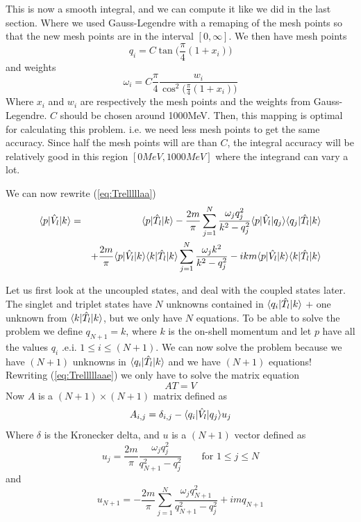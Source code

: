 This is now a smooth integral, and we can compute it like we did in the last section. Where we used Gauss-Legendre with a remaping
of the mesh points so that the new mesh points are in the interval $[0,\infty]$. 
We then have mesh points
\begin{equation}
q_i=C\tan\bigg(\frac{\pi}{4}(1+x_i)\bigg)
\end{equation}
and weights
\begin{equation}
\omega_i=C\frac{\pi}{4}\frac{w_i}{\cos ^2\big(\frac{\pi}{4}(1+x_i)\big)}
\end{equation}
Where $x_i$ and $w_i$ are respectively the mesh points and the weights from Gauss-Legendre. $C$ should be chosen around 1000MeV. 
Then, this mapping is optimal
for calculating this problem. i.e. we need less mesh points to get the same accuracy. Since half the mesh points will are
than $C$, the integral accuracy will be relatively good in this region $[0 MeV,1000 MeV]$ where the integrand can vary a lot.   

We can now rewrite (\ref{eq:Trelllllaa})
\begin{eqnarray}\label{eq:Trelllllaae}
\braketm{{ p}}{\op{V}_l}{{ k}}&=&\braketm{{ p}} {\op{T}_l}{{ k}}
- \frac{2m}{\pi}\sum^N_{j=1}
\frac{\omega_j q^2_j}{{ k^2}-{ q^2_j}}\bra{{ p}}\op{V}_l\ket{{ q_j}} \bra{{ q_j}} \op{T}_l\ket{{ k}}\nonumber\\
&&+
\frac{2m}{\pi}\bra{{ p}}\op{V}_l\ket{{ k}}
\bra{{ k}} \op{T}_l\ket{{ k}}\sum^N_{j=1} \frac{\omega_jk^2}{{ k^2}-{ q^2_j}}
-
i { k}m \bra{{ p}}\op{V_l}\ket{{ k}}
\bra{{ k}}\op{T}_l\ket{{ k}}
\end{eqnarray}

Let us first look at the  uncoupled states, and deal with the coupled  states later. 
The singlet and triplet states have $N$ unknowns contained in $\langle{ q_i}|\hat{T}_l|{ k}\rangle$ $+$ one unknown from
$\langle{ k}|\hat{T}_l|{ k}\rangle$, but we only have $N$ equations. To be able to solve the problem we 
define $q_{N+1}=k$, where $k$ is the on-shell momentum 
and let $p$ have all the values $q_i$ .e.i. $1\le i\le(N+1)$.
We can now solve the problem because we have
$(N+1)$ unknowns in $\langle{ q_i}|\hat{T}_l|{k}\rangle$ and we have $(N+1)$ equations!
Rewriting (\ref{eq:Trelllllaae}) we only have to solve the matrix equation
\begin{equation}\label{eq:AT=V} 
AT=V
\end{equation}
Now $A$ is a $(N+1)\times (N+1)$ matrix defined as
\begin{equation}
A_{i,j}=\delta_{i,j}-\langle{ q_i}|\hat{V}_l|{ q_j}\rangle u_j
\end{equation}
Where $\delta$ is the Kronecker delta, and $u$ is a $(N+1)$ vector defined as
\begin{equation}\label{eq:uj1}
u_j=\frac{2m}{\pi}\frac{\omega_jq^2_j}{q^2_{N+1}-{ q^2_j}}\qquad\textrm{for $1\le j\le N$}
\end{equation}
and
\begin{equation}\label{eq:ujN1}
u_{N+1}=-\frac{2m}{\pi}\sum^N_{j=1}\frac{\omega_jq^2_{N+1}}{{ q^2_{N+1}}-{ q^2_j}}+  im q_{N+1}
\end{equation}

